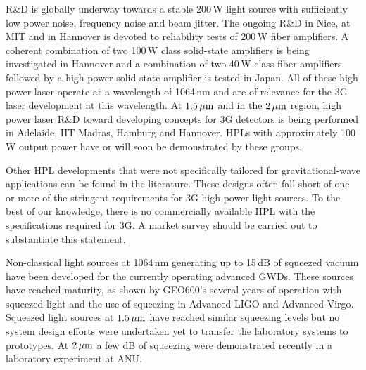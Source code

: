 R\&D is globally underway towards a stable 200\,W light source with sufficiently low power noise, frequency noise and beam jitter. 
The ongoing R\&D in Nice, at MIT and in Hannover is devoted to reliability tests of 200\,W fiber amplifiers. A coherent combination of two 100\,W class solid-state amplifiers is being investigated in Hannover and a combination of two 40\,W class fiber amplifiers followed by a high power solid-state amplifier is tested in Japan. All of these high power laser operate at a wavelength of 1064\,nm and are of relevance for the 3G laser development at this wavelength. At $ 1.5\, {\rm \mu m}$ and in the $ 2\, {\rm \mu m}$ region, high power laser R\&D toward developing concepts for 3G detectors is being performed in Adelaide, IIT Madras, Hamburg and Hannover. HPLs with approximately 100\,W output power have or will soon be demonstrated by these groups. 

Other HPL developments that were not specifically tailored for gravitational-wave applications can be found in the literature. These designs often fall short of one or more of the stringent requirements for 3G high power light sources. To the best of our knowledge, there is no commercially available HPL with the specifications required for 3G. A market survey should be carried out to substantiate this statement.

Non-classical light sources at 1064\,nm generating up to 15\,dB of squeezed vacuum have been developed for the currently operating advanced GWDs. These sources have reached maturity, as shown by GEO600's several years of operation with squeezed light and the use of squeezing in Advanced LIGO and Advanced Virgo. Squeezed light sources at $ 1.5\, {\rm \mu m}$ have reached similar squeezing levels but no system design efforts were undertaken yet to transfer the laboratory systems to prototypes. At $ 2\, {\rm \mu m}$ a few dB of squeezing were demonstrated recently in a laboratory experiment at ANU.

